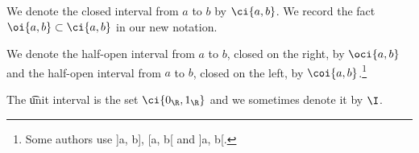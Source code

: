 We denote the closed interval from $a$ to $b$ by $\ci{a, b}$.
We record the fact $\oi{a, b} \subset \ci{a, b}$ in our new notation.

We denote the half-open interval from $a$ to $b$, closed on the right, by $\oci{a, b}$ and the half-open interval from $a$ to $b$, closed on the left, by $\coi{a, b}$.\footnote{Some authors use ]a, b], [a, b[ and ]a, b[.}

The \t{unit interval} is the set $\ci{0_{\R }, 1_{\R }}$ and we sometimes denote it by $\I$.

